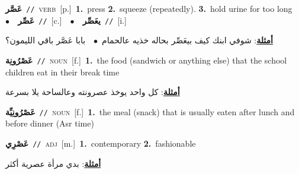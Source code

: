\documentclass[10pt,a4paper,twoside]{article} %
\begin{document}
\begin{multicols}{2}
{\setlength\topsep{0pt}\textbf{\foreignlanguage{arabic}{عَصَّر}}\ {\color{gray}\texttt{//}\color{black}}\ \textsc{verb}\ [p.]\ \textbf{1.}~press  \textbf{2.}~squeeze (repeatedly).  \textbf{3.}~hold urine for too long\ \ $\bullet$\ \ \setlength\topsep{0pt}\textbf{\foreignlanguage{arabic}{عَصِّر}}\ {\color{gray}\texttt{//}\color{black}}\ [c.]\ \ $\bullet$\ \ \setlength\topsep{0pt}\textbf{\foreignlanguage{arabic}{يعَصِّر}}\ {\color{gray}\texttt{//}\color{black}}\ [i.]\  \begin{flushright}\color{gray}\foreignlanguage{arabic}{\textbf{\underline{\foreignlanguage{arabic}{أمثلة}}}: شوفي ابنك كيف بيعَصِّر بحاله خذيه عالحمام\ $\bullet$\ \  بابا عَصَّر باقي الليمون؟}\end{flushright}\color{black}} \vspace{2mm}

{\setlength\topsep{0pt}\textbf{\foreignlanguage{arabic}{عَصْرُونِة}}\ {\color{gray}\texttt{//}\color{black}}\ \textsc{noun}\ [f.]\ \textbf{1.}~the food (sandwich or anything else) that the school children eat in their break time\  \begin{flushright}\color{gray}\foreignlanguage{arabic}{\textbf{\underline{\foreignlanguage{arabic}{أمثلة}}}: كل واحد يوخذ عصرونته وعالساحة يلا بسرعة}\end{flushright}\color{black}} \vspace{2mm}

{\setlength\topsep{0pt}\textbf{\foreignlanguage{arabic}{عَصْرُونِيِّة}}\ {\color{gray}\texttt{//}\color{black}}\ \textsc{noun}\ [f.]\ \textbf{1.}~the meal (snack) that is usually eaten after lunch and before dinner (Asr time)\ } \vspace{2mm}

{\setlength\topsep{0pt}\textbf{\foreignlanguage{arabic}{عَصْرِي}}\ {\color{gray}\texttt{//}\color{black}}\ \textsc{adj}\ [m.]\ \textbf{1.}~contemporary  \textbf{2.}~fashionable\  \begin{flushright}\color{gray}\foreignlanguage{arabic}{\textbf{\underline{\foreignlanguage{arabic}{أمثلة}}}: بدي مرأة عصرية أكثر}\end{flushright}\color{black}} \vspace{2mm}


\end{multicols}
\end{document}

